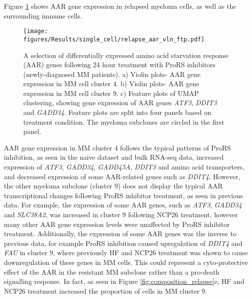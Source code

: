 Figure \ref{fig:relapse_aar_vln_ftp} shows AAR gene expression in relapsed myeloma cells, as well as the surrounding immune cells.
%
\begin{figure}[htb]
\centering
\texttt{[image: figures/Results/single\_cell/relapse\_aar\_vln\_ftp.pdf]}
\caption[Differentially expressed AAR genes- relapsed MM]{A selection of differentially expressed amino acid starvation response (AAR) genes following 24 hour treatment with ProRS inhibitors (newly-diagnosed MM patients).
    a) Violin plots- AAR gene expression in MM cell cluster 4.
    b) Violin plots- AAR gene expression in MM cell cluster 9.
    c) Feature plots of UMAP clustering, showing gene expression of AAR genes \textit{ATF3}, \textit{DDIT3} and \textit{GADD34}.
Feature plots are split into four panels based on treatment condition.
The myeloma subclones are circled in the first panel.
}
\label{fig:relapse_aar_vln_ftp}
\end{figure}
AAR gene expression in MM cluster 4 follows the typical patterns of ProRS inhibition, as seen in the naive dataset and bulk RNA-seq data, increased expression of \textit{ATF3}, \textit{GADD34}, \textit{GADD45A}, \textit{DDIT3} and amino acid transporters, and decreased expression of some AAR-related genes such as \textit{DDIT4}.
However, the other myeloma subclone (cluster 9) does not display the typical AAR transcriptional changes following ProRS inhibitor treatment, as seen in previous data.
For example, the expression of some AAR genes, such as \textit{ATF3}, \textit{GADD34} and \textit{SLC38A2}, was increased in cluster 9 following NCP26 treatment, however many other AAR gene expression levels were unaffected by ProRS inhibitor treatment.
Additionally, the expression of some AAR genes was the inverse to previous data, for example ProRS inhibition caused upregulation of \textit{DDIT4} and \textit{FAU} in cluster 9, where previously HF and NCP26 treatment was shown to cause downregulation of these genes in MM cells.
This could represent a cyto-protective effect of the AAR in the resistant MM subclone rather than a pro-death signalling response.
In fact, as seen in Figure \ref{fig:composition_relapse}e, HF and NCP26 treatment increased the proportion of cells in MM cluster 9.

